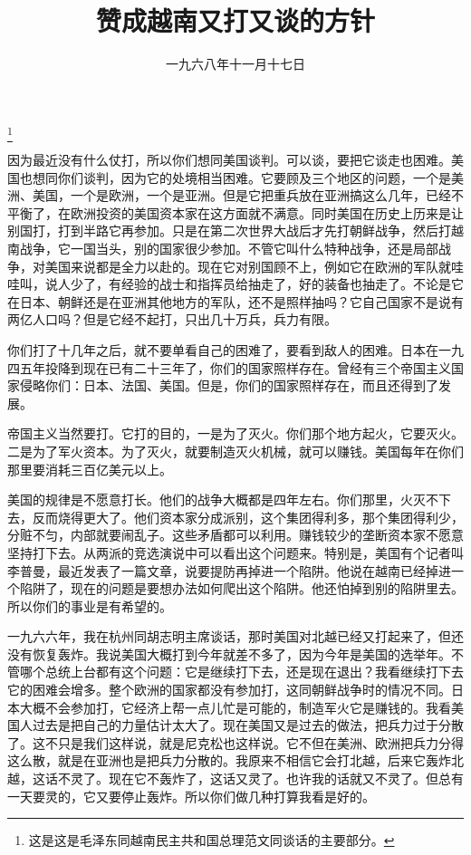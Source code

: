 
\title{赞成越南又打又谈的方针}
\date{一九六八年十一月十七日}
\thanks{这是这是毛泽东同越南民主共和国总理范文同谈话的主要部分。}
\maketitle


因为最近没有什么仗打，所以你们想同美国谈判。可以谈，要把它谈走也困难。美国也想同你们谈判，因为它的处境相当困难。它要顾及三个地区的问题，一个是美洲、美国，一个是欧洲，一个是亚洲。但是它把重兵放在亚洲搞这么几年，已经不平衡了，在欧洲投资的美国资本家在这方面就不满意。同时美国在历史上历来是让别国打，打到半路它再参加。只是在第二次世界大战后才先打朝鲜战争，然后打越南战争，它一国当头，别的国家很少参加。不管它叫什么特种战争，还是局部战争，对美国来说都是全力以赴的。现在它对别国顾不上，例如它在欧洲的军队就哇哇叫，说人少了，有经验的战士和指挥员给抽走了，好的装备也抽走了。不论是它在日本、朝鲜还是在亚洲其他地方的军队，还不是照样抽吗？它自己国家不是说有两亿人口吗？但是它经不起打，只出几十万兵，兵力有限。

你们打了十几年之后，就不要单看自己的困难了，要看到敌人的困难。日本在一九四五年投降到现在已有二十三年了，你们的国家照样存在。曾经有三个帝国主义国家侵略你们：日本、法国、美国。但是，你们的国家照样存在，而且还得到了发展。

帝国主义当然要打。它打的目的，一是为了灭火。你们那个地方起火，它要灭火。二是为了军火资本。为了灭火，就要制造灭火机械，就可以赚钱。美国每年在你们那里要消耗三百亿美元以上。

美国的规律是不愿意打长。他们的战争大概都是四年左右。你们那里，火灭不下去，反而烧得更大了。他们资本家分成派别，这个集团得利多，那个集团得利少，分赃不匀，内部就要闹乱子。这些矛盾都可以利用。赚钱较少的垄断资本家不愿意坚持打下去。从两派的竞选演说中可以看出这个问题来。特别是，美国有个记者叫李普曼，最近发表了一篇文章，说要提防再掉进一个陷阱。他说在越南已经掉进一个陷阱了，现在的问题是要想办法如何爬出这个陷阱。他还怕掉到别的陷阱里去。所以你们的事业是有希望的。

一九六六年，我在杭州同胡志明主席谈话，那时美国对北越已经又打起来了，但还没有恢复轰炸。我说美国大概打到今年就差不多了，因为今年是美国的选举年。不管哪个总统上台都有这个问题：它是继续打下去，还是现在退出？我看继续打下去它的困难会增多。整个欧洲的国家都没有参加打，这同朝鲜战争时的情况不同。日本大概不会参加打，它经济上帮一点儿忙是可能的，制造军火它是赚钱的。我看美国人过去是把自己的力量估计太大了。现在美国又是过去的做法，把兵力过于分散了。这不只是我们这样说，就是尼克松也这样说。它不但在美洲、欧洲把兵力分得这么散，就是在亚洲也是把兵力分散的。我原来不相信它会打北越，后来它轰炸北越，这话不灵了。现在它不轰炸了，这话又灵了。也许我的话就又不灵了。但总有一天要灵的，它又要停止轰炸。所以你们做几种打算我看是好的。

